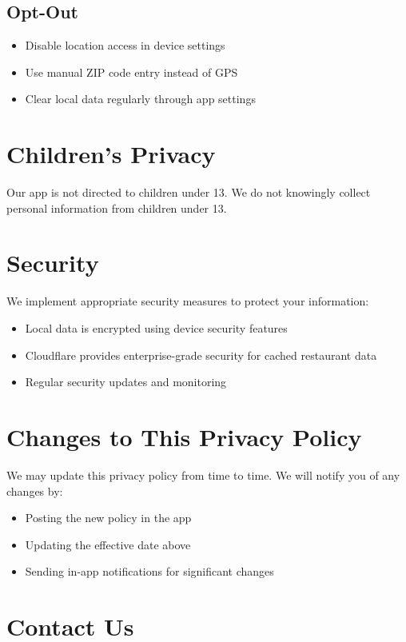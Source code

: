 \documentclass[11pt,letterpaper]{article}
\begin{document}
\subsection{Opt-Out}
\begin{itemize}
    \item Disable location access in device settings
    \item Use manual ZIP code entry instead of GPS
    \item Clear local data regularly through app settings
\end{itemize}

\section{Children's Privacy}

Our app is not directed to children under 13. We do not knowingly collect personal information from children under 13.

\section{Security}

We implement appropriate security measures to protect your information:
\begin{itemize}
    \item Local data is encrypted using device security features
    \item Cloudflare provides enterprise-grade security for cached restaurant data
    \item Regular security updates and monitoring
\end{itemize}

\section{Changes to This Privacy Policy}

We may update this privacy policy from time to time. We will notify you of any changes by:
\begin{itemize}
    \item Posting the new policy in the app
    \item Updating the effective date above
    \item Sending in-app notifications for significant changes
\end{itemize}

\section{Contact Us}
\end{document}
